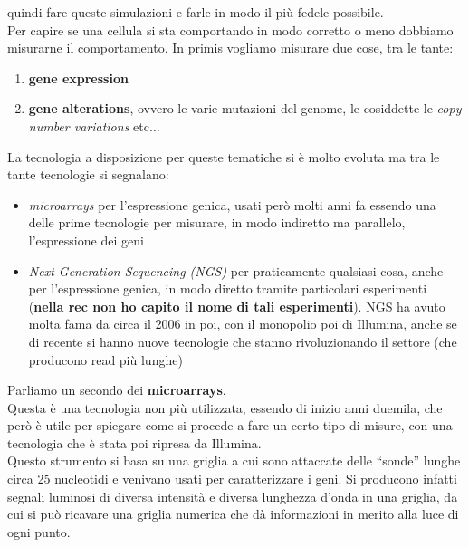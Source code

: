 \documentclass[a4paper,12pt, oneside]{book}
\begin{document}
quindi fare queste simulazioni e farle in modo il più fedele possibile.\\
Per capire se una cellula si sta comportando in modo corretto o meno dobbiamo
misurarne il comportamento. In primis vogliamo misurare due cose, tra le tante:
\begin{enumerate}
  \item \textbf{gene expression}
  \item \textbf{gene alterations}, ovvero le varie mutazioni del genome, le
  cosiddette le \textit{copy number variations} etc$\ldots$
\end{enumerate}
La tecnologia a disposizione per queste tematiche si è molto evoluta ma tra le
tante tecnologie si segnalano:
\begin{itemize}
  \item \textit{microarrays} per l'espressione genica, usati però molti anni fa
  essendo una delle prime tecnologie per misurare, in modo indiretto ma
  parallelo, l'espressione dei geni
  \item \textit{Next Generation Sequencing (NGS)} per praticamente qualsiasi
  cosa, anche per l'espressione genica, in modo diretto tramite particolari
  esperimenti (\textbf{nella rec non ho capito il nome di tali
    esperimenti}). NGS ha avuto molta fama da circa il 2006 in poi, con il
  monopolio poi di Illumina, anche se di recente si hanno nuove tecnologie che
  stanno rivoluzionando il settore (che producono read più lunghe)
\end{itemize}
Parliamo un secondo dei \textbf{microarrays}.\\
Questa è una tecnologia non più utilizzata, essendo di inizio anni duemila, che
però è utile per spiegare come si procede a fare un certo tipo di misure, con
una tecnologia che è stata poi ripresa da Illumina.\\
Questo strumento si basa su una griglia a cui sono attaccate delle ``sonde''
lunghe circa 25 nucleotidi e venivano usati per caratterizzare i geni. Si
producono infatti segnali luminosi di diversa intensità e diversa lunghezza
d'onda in una griglia, da cui si può ricavare una griglia numerica che dà
informazioni in merito alla luce di ogni punto.
\end{document}
